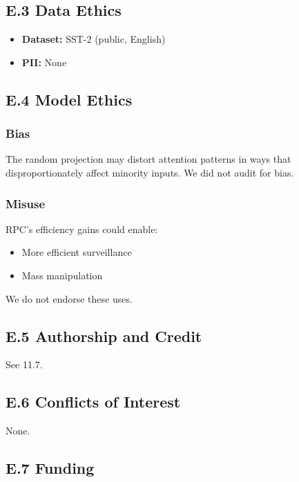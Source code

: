 \subsection{E.3 Data Ethics}

\begin{itemize}
\item \textbf{Dataset:} SST-2 (public, English)
\item \textbf{PII:} None

\end{itemize}
\subsection{E.4 Model Ethics}

\subsubsection{Bias}

The random projection may distort attention patterns in ways that 
disproportionately affect minority inputs. We did not audit for bias.

\subsubsection{Misuse}

RPC's efficiency gains could enable:

\begin{itemize}
\item More efficient surveillance
\item Mass manipulation

\end{itemize}
We do not endorse these uses.

\subsection{E.5 Authorship and Credit}

See  11.7.

\subsection{E.6 Conflicts of Interest}

None.

\subsection{E.7 Funding}

